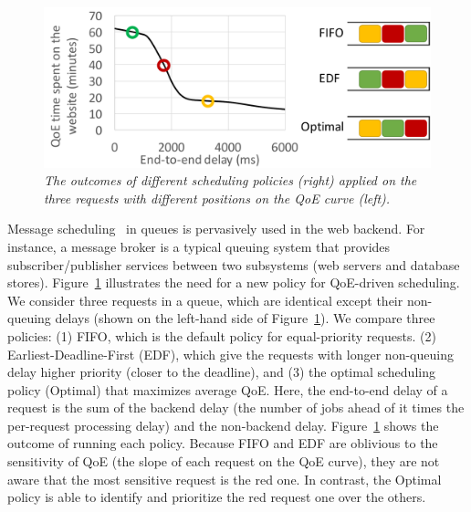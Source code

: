 \begin{figure}
	\centering
	\includegraphics[width=1.0\textwidth]{figs/scheduling.pdf}
	\vspace{-0.6cm}
	\caption{\em The outcomes of different scheduling policies (right) applied on the three requests with different positions on the QoE curve (left).}
	\label{fig:scheduling}
\end{figure}
Message scheduling~\cite{rabbitmq,kafka} in queues is pervasively used in the web backend. 
For instance, a message broker is a typical queuing system that provides subscriber/publisher services between two subsystems (\eg web servers and database stores). 
Figure~\ref{fig:scheduling} illustrates the need for a new policy for QoE-driven scheduling. 
We consider three requests in a queue, which are identical except their non-queuing delays (shown on the left-hand side of Figure~\ref{fig:scheduling}).
We compare three policies: 
(1) FIFO, which is the default policy for equal-priority requests.
(2) Earliest-Deadline-First (EDF), which give the requests with longer non-queuing delay higher priority (\ie closer to the deadline), and 
(3) the optimal scheduling policy (Optimal) that maximizes average QoE.
Here, the end-to-end delay of a request is the sum of the backend delay (\ie the number of jobs ahead of it times the per-request processing delay) and the non-backend delay.
Figure~\ref{fig:scheduling}  shows the outcome of running each policy. 
Because FIFO and EDF are oblivious to the sensitivity of QoE (\ie the slope of each request on the QoE curve), they are not aware that the most sensitive request is the red one.
In contrast, the Optimal policy is able to identify and prioritize the red request one over the others.

